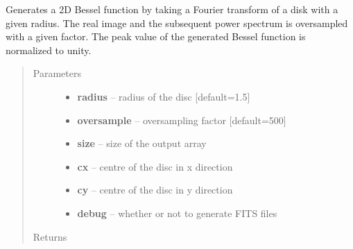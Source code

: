 \documentclass[a4paper,11pt,english]{sphinxmanual}
\begin{document}
\begin{fulllineitems}
\label{analysis:analysis.analyseSpotMeasurements.generateBessel}
Generates a 2D Bessel function by taking a Fourier transform of a disk with a given radius. The real image
and the subsequent power spectrum is oversampled with a given factor. The peak value of the generated
Bessel function is normalized to unity.
\begin{quote}\begin{description}
\item[{Parameters}] \leavevmode\begin{itemize}
\item {} 
\textbf{radius} -- radius of the disc {[}default=1.5{]}

\item {} 
\textbf{oversample} -- oversampling factor {[}default=500{]}

\item {} 
\textbf{size} -- size of the output array

\item {} 
\textbf{cx} -- centre of the disc in x direction

\item {} 
\textbf{cy} -- centre of the disc in y direction

\item {} 
\textbf{debug} -- whether or not to generate FITS files

\end{itemize}

\item[{Returns}] \leavevmode


\end{description}\end{quote}

\end{fulllineitems}

\end{document}
